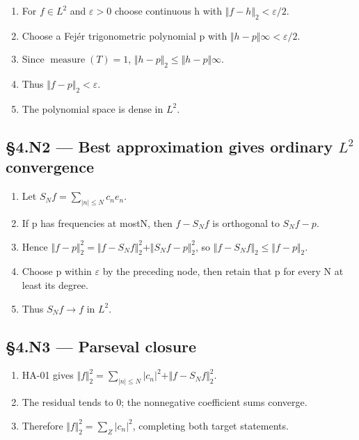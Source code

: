 \documentclass[preprint,12pt,aps,pra,showkeys,amsmath,amssymb,superscriptaddress,floatfix]{revtex4-2}
\theoremstyle{definition}
\theoremstyle{remark}
\begin{document}
\begin{enumerate}
\def\labelenumi{\arabic{enumi}.}
\item
  For \(f\in L^{2}\) and \(\varepsilon >0\) choose continuous h with
  \(\Vert f-h\Vert _{2}<\varepsilon /2\).
\item
  Choose a Fejér trigonometric polynomial p with
  \(\Vert h-p\Vert \infty <\varepsilon /2\).
\item
  Since \(\operatorname{measure} (T)=1\),
  \(\Vert h-p\Vert _{2}\le \Vert h-p\Vert \infty\).
\item
  Thus \(\Vert f-p\Vert _{2}<\varepsilon\).
\item
  The polynomial space is dense in \(L^{2}\).
\end{enumerate}

\subsection{\texorpdfstring{§4.N2 --- Best approximation gives ordinary
\(L^{2}\)
convergence}{§4.N2 --- Best approximation gives ordinary L\^{}\{2\} convergence}}\label{n2-best-approximation-gives-ordinary-l2-convergence}

\begin{enumerate}
\def\labelenumi{\arabic{enumi}.}
\item
  Let \(S_Nf=\sum _{|n|\le N}c_ne_n\).
\item
  If p has frequencies at mostN, then \(f-S_Nf\) is orthogonal to
  \(S_Nf-p\).
\item
  Hence
  \(\Vert f-p\Vert _{2}^{2}=\Vert f-S_Nf\Vert _{2}^{2}+\Vert S_Nf-p\Vert _{2}^{2}\),
  so \(\Vert f-S_Nf\Vert _{2}\le \Vert f-p\Vert _{2}\).
\item
  Choose p within \(\varepsilon\) by the preceding node, then retain
  that p for every N at least its degree.
\item
  Thus \(S_Nf\to f\) in \(L^{2}\).
\end{enumerate}

\subsection{§4.N3 --- Parseval closure}\label{n3-parseval-closure}

\begin{enumerate}
\def\labelenumi{\arabic{enumi}.}
\item
  HA-01 gives
  \(\Vert f\Vert _{2}^{2}=\sum _{|n|\le N}|c_n|^{2}+\Vert f-S_Nf\Vert _{2}^{2}\).
\item
  The residual tends to 0; the nonnegative coefficient sums converge.
\item
  Therefore \(\Vert f\Vert _{2}^{2}=\sum _Z|c_n|^{2}\), completing both
  target statements.
\end{enumerate}
\end{document}
